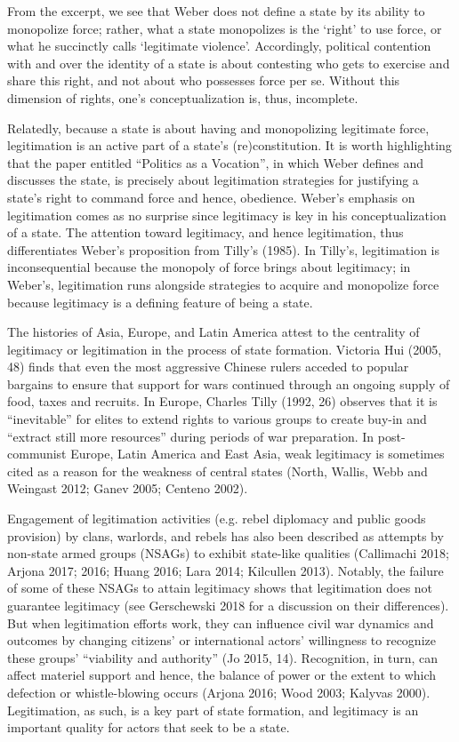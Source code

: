 \documentclass [11pt]{article}
\begin{document}
From the excerpt, we see that Weber does not define a state by its ability to monopolize force; rather, what a state monopolizes is the `right' to use force, or what he succinctly calls `legitimate violence'. Accordingly, political contention with and over the identity of a state is about contesting who gets to exercise and share this right, and not about who possesses force per se. Without this dimension of rights, one's conceptualization is, thus, incomplete.

Relatedly, because a state is about having and monopolizing legitimate force, legitimation is an active part of a state's (re)constitution. It is worth highlighting that the paper entitled ``Politics as a Vocation'', in which Weber defines and discusses the state, is precisely about legitimation strategies for justifying a state's right to command force and hence, obedience. Weber's emphasis on legitimation comes as no surprise since legitimacy is key in his conceptualization of a state. The attention toward legitimacy, and hence legitimation, thus differentiates Weber's proposition from Tilly's (1985). In Tilly's, legitimation is inconsequential because the monopoly of force brings about legitimacy; in Weber's, legitimation runs alongside strategies to acquire and monopolize force because legitimacy is a defining feature of being a state.

The histories of Asia, Europe, and Latin America attest to the centrality of legitimacy or legitimation in the process of state formation. Victoria Hui (2005, 48) finds that even the most aggressive Chinese rulers acceded to popular bargains to ensure that support for wars continued through an ongoing supply of food, taxes and recruits. In Europe, Charles Tilly (1992, 26) observes that it is ``inevitable'' for elites to extend rights to various groups to create buy-in and ``extract still more resources'' during periods of war preparation. In post-communist Europe, Latin America and East Asia, weak legitimacy is sometimes cited as a reason for the weakness of central states (North, Wallis, Webb and Weingast 2012; Ganev 2005; Centeno 2002).

Engagement of legitimation activities (e.g. rebel diplomacy and public goods provision) by clans, warlords, and rebels has also been described as attempts by non-state armed groups (NSAGs) to exhibit state-like qualities (Callimachi 2018; Arjona 2017; 2016; Huang 2016; Lara 2014; Kilcullen 2013). Notably, the failure of some of these NSAGs to attain legitimacy shows that legitimation does not guarantee legitimacy (see Gerschewski 2018 for a discussion on their differences). But when legitimation efforts work, they can influence civil war dynamics and outcomes by changing citizens' or international actors' willingness to recognize these groups' ``viability and authority'' (Jo 2015, 14). Recognition, in turn, can affect materiel support and hence, the balance of power or the extent to which defection or whistle-blowing occurs (Arjona 2016; Wood 2003; Kalyvas 2000). Legitimation, as such, is a key part of state formation, and legitimacy is an important quality for actors that seek to be a state.
\end{document}
